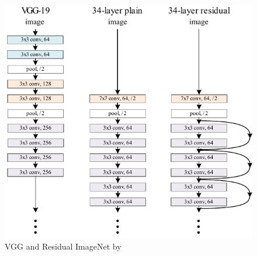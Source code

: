 \hspace{1em}
\begin{minipage}[ht]{.62\textwidth}
    \begin{figure}[H]
        \centering
    \includegraphics[width=.99\textwidth]{literature/imgs/ext-CNN-ResNet.pdf}
    \caption{VGG and Residual ImageNet by \citet{he2015deep}}
    \label{fig:ext-CNN-ResNet}
    \end{figure}
\end{minipage}